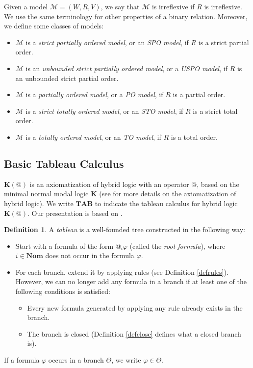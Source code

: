 \documentclass{article}
\makeatletter
\theoremstyle{definition}
\newtheorem{definition}{Definition}[section]
\newcommand{\Nom}{\mathbf{Nom}}
\newcommand{\Kmodel}{\mathcal{M}}
\newcommand{\tableau}{\mathbf{TAB}}
\newcommand{\hybridK}{\mathbf{K(@)}}
\makeatother
\begin{document}
Given a model $\Kmodel = (W, R, V)$, we say that $\Kmodel$ is irreflexive if $R$ is irreflexive. We use the same terminology for other properties of a binary relation. Moreover, we define some classes of models:
\begin{itemize}
    \item $\Kmodel$ is a \emph{strict partially ordered model}, or an \emph{SPO model}, if $R$ is a strict partial order.
    \item $\Kmodel$ is an \emph{unbounded strict partially ordered model}, or a \emph{USPO model}, if $R$ is an unbounded strict partial order.
    \item $\Kmodel$ is a \emph{partially ordered model}, or a \emph{PO model}, if $R$ is a partial order.
    \item $\Kmodel$ is a \emph{strict totally ordered model}, or an \emph{STO model}, if $R$ is a strict total order.
    \item $\Kmodel$ is a \emph{totally ordered model}, or an \emph{TO model}, if $R$ is a total order.
\end{itemize}

\subsection{Basic Tableau Calculus}
\label{secsyntaxK}

$\hybridK$ is an axiomatization of hybrid logic with an operator $@$, based on the minimal normal modal logic $\mathbf{K}$ (see \cite{blackburn2006P} for more details on the axiomatization of hybrid logic). We write $\tableau$ to indicate the tableau calculus for hybrid logic $\hybridK$. Our presentation is based on \cite{bolander2007}.

\begin{definition}
  A \emph{tableau} is a well-founded tree constructed in the following way:
  \begin{itemize}
    \item Start with a formula of the form $@_i \varphi$ (called the \emph{root formula}), where $i \in \Nom$ does not occur in the formula $\varphi$.
    \item For each branch, extend it by applying rules (see Definition \ref{defrules}). However, we can no longer add any formula in a branch if at least one of the following conditions is satisfied:
    \begin{itemize}
        \item Every new formula generated by applying any rule already exists in the branch.
        \item The branch is closed (Definition \ref{defclose} defines what a closed branch is).
    \end{itemize}
  \end{itemize}
  If a formula $\varphi$ occurs in a branch $\Theta$, we write $\varphi \in \Theta$.
  \label{deftableau}
\end{definition}
\end{document}
